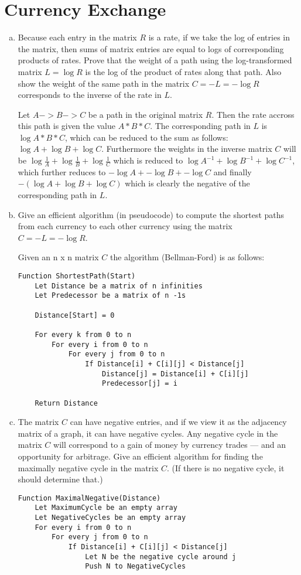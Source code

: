 \documentclass[12pt]{article}
\begin{document}
\section{Currency Exchange}\label{currency exchange}
\begin{enumerate}[(a)]
\item Because each entry in the matrix $R$ is a rate, if we take the log of entries in the matrix, then sums of matrix entries are equal to logs of corresponding products of rates. Prove that the weight of a path using the log-transformed matrix $L = \log R$ is the log of the product of rates along that path. Also show the weight of the same path in the matrix $C = -L = - \log R$ corresponds to the inverse of the rate in $L$.
\begin{addmargin}[2em]{2em}
Let $A -> B -> C$ be a path in the original matrix $R$. Then the rate accross this path is given the value $A * B * C$. The corresponding path in $L$ is $\log{A * B * C}$, which can be reduced to the sum as follows: $\log{A} + \log{B} + \log{C}$. Furthermore the weights in the inverse matrix $C$ will be $\log{\frac{1}{A}} + \log{\frac{1}{B}} + \log{\frac{1}{C}}$ which is reduced to $\log{A^{-1}} + \log{B^{-1}} + \log{C^{-1}}$, which further reduces to $-\log{A} + -\log{B} + -\log{C}$ and finally $-(\log{A} + \log{B} + \log{C})$ which is clearly the negative of the corresponding path in $L$.
\end{addmargin}
\item Give an efficient algorithm (in pseudocode) to compute the shortest paths from each currency to each other currency using the matrix $C = -L = - \log R$.
\begin{addmargin}[2em]{2em}
Given an n x n matrix $C$ the algorithm (Bellman-Ford) is as follows:
\begin{lstlisting}
Function ShortestPath(Start)
	Let Distance be a matrix of n infinities
	Let Predecessor be a matrix of n -1s

	Distance[Start] = 0

	For every k from 0 to n
		For every i from 0 to n
			For every j from 0 to n
				If Distance[i] + C[i][j] < Distance[j]
					Distance[j] = Distance[i] + C[i][j]
					Predecessor[j] = i

	Return Distance
\end{lstlisting}
\end{addmargin}
\item The matrix $C$ can have negative entries, and if we view it as the adjacency matrix of a graph, it can have negative cycles. Any negative cycle in the matrix $C$ will correspond to a gain of money by currency trades — and an opportunity for arbitrage. Give an efficient algorithm for finding the maximally negative cycle in the matrix $C$. (If there is no negative cycle, it should determine that.)
\begin{addmargin}[2em]{2em}
\begin{lstlisting}
Function MaximalNegative(Distance)
	Let MaximumCycle be an empty array
	Let NegativeCycles be an empty array
	For every i from 0 to n
		For every j from 0 to n
			If Distance[i] + C[i][j] < Distance[j]
				Let N be the negative cycle around j
				Push N to NegativeCycles


\end{lstlisting}
\end{addmargin}
\end{enumerate}
\end{document}

